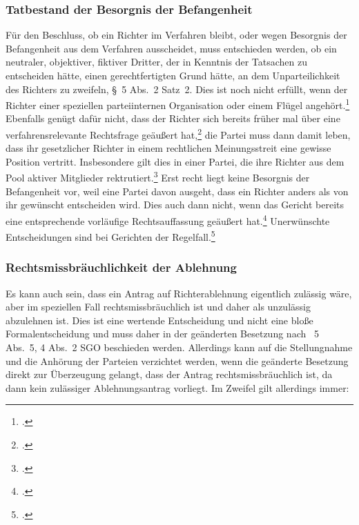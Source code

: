 \subsubsection{Tatbestand der Besorgnis der Befangenheit}
\label{Zusammensetzung:Spruchkoerper:Befangenheitsbesorgnis:Tatbestand}
Für den Beschluss, ob ein Richter im Verfahren bleibt, oder wegen Besorgnis der Befangenheit aus dem Verfahren ausscheidet, muss entschieden werden, ob ein neutraler, objektiver, fiktiver Dritter, der in Kenntnis der Tatsachen zu entscheiden hätte, einen gerechtfertigten Grund hätte, an dem Unparteilichkeit des Richters zu zweifeln, \S~5 Abs.~2 Satz~2.
Dies ist noch nicht erfüllt, wenn der Richter einer speziellen parteiinternen Organisation oder einem Flügel angehört.\footnote{\cite[S.~6]{BSG115HSBefangeheitIII}.}
Ebenfalls genügt dafür nicht, dass der Richter sich bereits früher mal über eine verfahrensrelevante Rechtsfrage geäußert hat,\footnote{\cite{BGHXIZR38801}.} die Partei muss dann damit leben, dass ihr gesetzlicher Richter in einem rechtlichen Meinungsstreit eine gewisse Position vertritt.
Insbesondere gilt dies in einer Partei, die ihre Richter aus dem Pool aktiver Mitglieder rektrutiert.\footnote{\cites[Lenski][\S~14 Rn~15]{lenski2011parteiengesetz}.}
Erst recht liegt keine Besorgnis der Befangenheit vor, weil eine Partei davon ausgeht, dass ein Richter anders als von ihr gewünscht entscheiden wird.
Dies auch dann nicht, wenn das Gericht bereits eine entsprechende vorläufige Rechtsauffassung geäußert hat.\footnote{\cites[S.~6]{BSG20131028}.}
Unerwünschte Entscheidungen sind bei Gerichten der Regelfall.\footnote{\cites[S.~2]{BSG201305062BefangenheitI}.}

\subsubsection{Rechtsmissbräuchlichkeit der Ablehnung}
\label{Zusammensetzung:Spruchkoerper:Befangenheitsbesorgnis:Rechtsmissbrauch}
Es kann auch sein, dass ein Antrag auf Richterablehnung eigentlich zulässig wäre, aber im speziellen Fall rechtsmissbräuchlich ist und daher als unzulässig abzulehnen ist.
Dies ist eine wertende Entscheidung und nicht eine bloße Formalentscheidung und muss daher in der geänderten Besetzung nach \SSS~5 Abs.~5, 4 Abs.~2 SGO beschieden werden.
Allerdings kann auf die Stellungnahme und die Anhörung der Parteien verzichtet werden, wenn die geänderte Besetzung direkt zur Überzeugung gelangt, dass der Antrag rechtsmissbräuchlich ist, da dann kein zulässiger Ablehnungsantrag vorliegt.
Im Zweifel gilt allerdings immer: 

